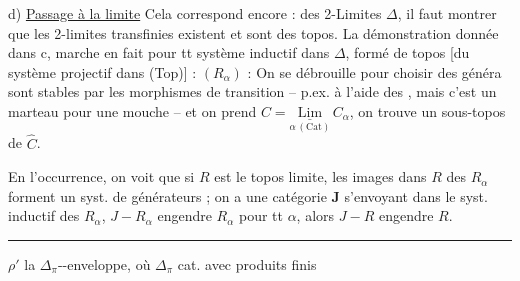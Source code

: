 
d) \uline{Passage à la limite} Cela correspond encore : des 2-Limites   $\Delta$, il faut montrer que les 2-limites transfinies existent et sont des topos. La démonstration donnée dans c, marche en fait pour tt système inductif  dans $\Delta$, formé de topos [du système projectif dans (Top)] : $(R_\alpha)$ : On se débrouille pour choisir des
  généra   sont stables par les morphismes de transition  -- p.ex. à l'aide des  , mais c'est un marteau pour une mouche -- et on prend  $C=\underset{\alpha\,(\mathrm{Cat})}{\underline{\mathrm{Lim}}}\, C_\alpha$, on  trouve un sous-topos de $\widehat C$.

En l'occurrence,   on voit que si  $R$ est le topos limite,  les images dans $R$ des $R_\alpha$ forment un syst. de générateurs ;   on a une  catégorie $\mathbf J$ s'envoyant dans le syst. inductif des $R_\alpha$, $J-R_\alpha$ engendre $R_\alpha$ pour tt $\alpha$, alors $J-R$ engendre $R$.

\par\noindent\rule{\linewidth}{.3pt}\par


$\rho'$ la $\Delta_\pi$--enveloppe, où $\Delta_\pi$ cat. avec produits finis

